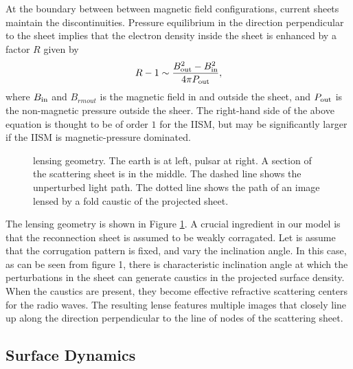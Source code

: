 \documentclass[useAMS,usenatbib]{mn2e}
\begin{document}
At the boundary between between magnetic field configurations, current
sheets maintain the discontinuities. Pressure equilibrium in the direction
perpendicular to the sheet implies that the electron density inside the sheet is
enhanced by a factor $R$ given by
\begin{equation} 
R-1\sim {B_{\rm out}^2-B_{\rm in}^2\over 4\pi P_{\rm out}},
\label{ratio}
\end{equation}
  where $B_{\rm in}$ and $B_{rm out}$ is the magnetic field in and outside the sheet,
  and $P_{\rm out}$ is the non-magnetic pressure outside the sheer. The right-hand side of
  the above equation is thought to be of order $1$ for the IISM, but may be significantly
  larger if the IISM is magnetic-pressure dominated. 

\begin{figure}
\centerline{}
\vspace{-6in}
\caption{lensing geometry.  The earth is at left, pulsar at right.
A section of the scattering sheet is in the middle.  The dashed line 
shows the  unperturbed light path.  The dotted line shows the path of 
an image
lensed by a fold caustic of the projected sheet.}
\label{fig:sheetgeom}
\end{figure}

The lensing geometry is shown in Figure \ref{fig:sheetgeom}. A crucial ingredient in our model
is that the reconnection sheet is assumed to be weakly corragated. Let is assume that the corrugation
pattern is fixed, and vary the inclination angle. In this case, as can be seen from 
figure 1,
there is characteristic inclination angle at which the perturbations in the
sheet can generate caustics in the projected surface density. When the caustics are present, they
become effective refractive scattering centers for the radio waves. The resulting lense features
multiple images that closely line up along the direction perpendicular to the line of nodes of the
scattering sheet.


\subsection{Surface Dynamics}
\end{document}

